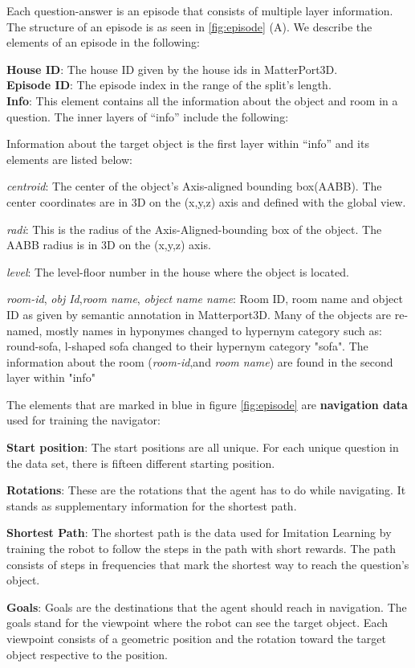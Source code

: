 Each question-answer is an episode that consists of multiple layer information. The structure of an episode is as seen in \ref{fig:episode} (A). We describe the elements of an episode in the following:  

\textbf{House ID}: The house ID given by the house ids in MatterPort3D.\\
\textbf{Episode ID}: The episode index in the range of the split’s length. \\
\textbf{Info}: This element contains all the information about the object and room in a question. The inner layers of “info” include the following: 

Information about the target object is the first layer within “info” and its elements are listed below: 

\textit{centroid}: The center of the object’s Axis-aligned bounding box(AABB). The center coordinates are in 3D on the (x,y,z) axis and defined with the global view. 

\textit{radi}: This is the radius of the Axis-Aligned-bounding box of the object. The AABB radius is in 3D on the (x,y,z) axis. 

\textit{level}: The level-floor number in the house where the object is located. 

\textit{room-id}, \textit{obj Id},\textit{room name}, \textit{object name name}: Room ID, room name and object ID as given by semantic annotation in  Matterport3D. Many of the objects are re-named, mostly names in hyponymes changed to hypernym category such as: round-sofa, l-shaped sofa changed to their hypernym category "sofa". The  information about the room (\textit{room-id},and \textit{room name})  are found in the second layer within "info"


The elements that are marked in blue in figure \ref{fig:episode} are \textbf{navigation data} used for training the navigator:

\textbf{Start position}: The start positions are all unique. For each unique question in the data set, there is fifteen different starting position. 

\textbf{Rotations}: These are the rotations that the agent has to do while navigating. It stands as supplementary information for the shortest path. 

\textbf{Shortest Path}: The shortest path is the data used for Imitation Learning by training the robot to follow the steps in the path with short rewards. The path consists of steps in frequencies that mark the shortest way to reach the question's object. 

\textbf{Goals}: Goals are the destinations that the agent should reach in navigation. The goals stand for the viewpoint where the robot can see the target object. Each viewpoint consists of a geometric position and the rotation toward the target object respective to the position. 











